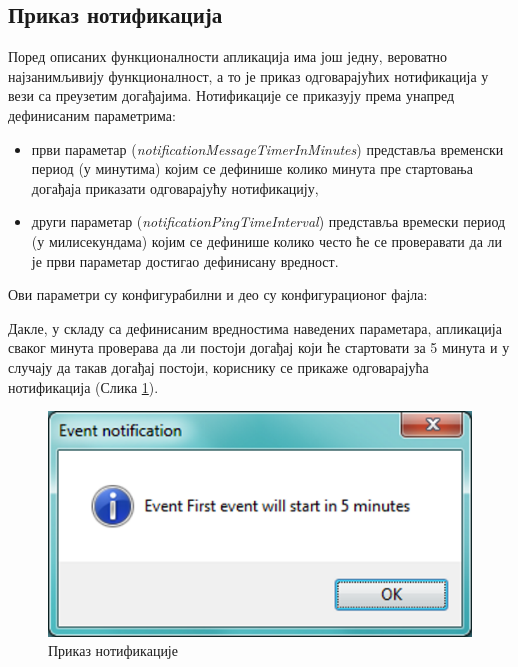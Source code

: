 \subsection{Приказ нотификација}

Поред описаних функционалности апликација има још једну, вероватно најзанимљивију функционалност, а то је приказ одговарајућих нотификација у вези са преузетим догађајима. Нотификације се приказују према унапред дефинисаним параметрима:
\begin{itemize}
	\item{први параметар (\textit{notificationMessageTimerInMinutes}) представља временски период (у минутима) којим се дефинише колико минута пре стартовања догађаја приказати одговарајућу нотификацију},
	\item{други параметар (\textit{notificationPingTimeInterval}) представља времески период (у милисекундама) којим се дефинише колико често ће се проверавати да ли је први параметар достигао дефинисану вредност}.	

\end{itemize}
Ови параметри су конфигурабилни и део су конфигурационог фајла:



Дакле, у складу са дефинисаним вредностима наведених параметара, апликација сваког минута проверава да ли постоји догађај који ће стартовати за 5 минута и у случају да такав догађај постоји, кориснику се прикаже одговарајућа нотификација (Слика \ref{fig:event_notification}).

\begin{figure}[H]
	\centering
	\includegraphics[scale=0.5]{slike/EventNotification.png}
	\caption{Приказ нотификације}
	\label{fig:event_notification}
\end{figure}

